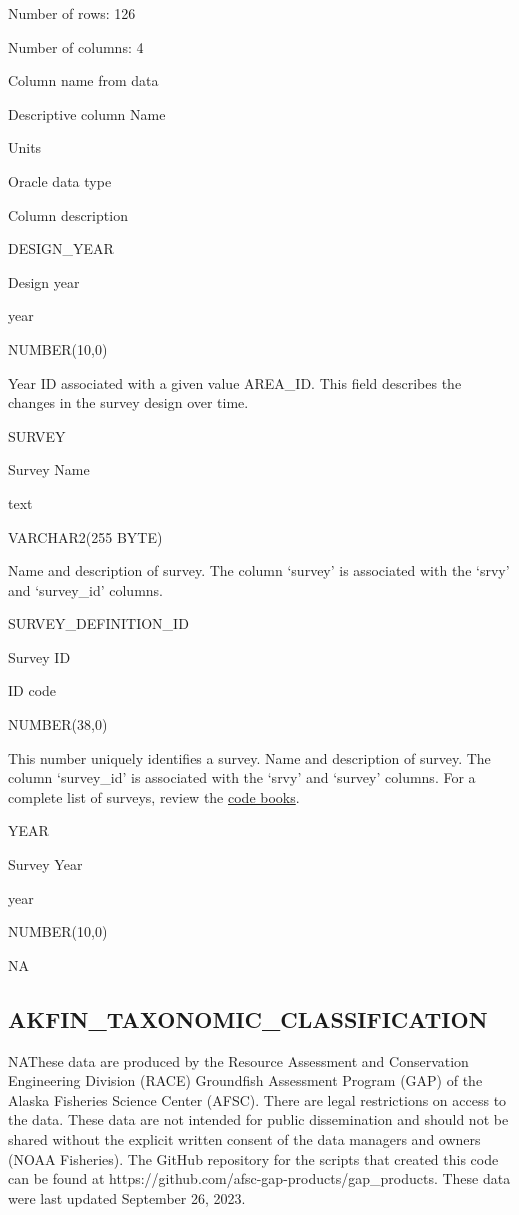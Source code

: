 \documentclass[
  letterpaper,
  oneside,
  open=any]{scrbook}
\begin{document}
Number of rows: 126

Number of columns: 4

Column name from data

Descriptive column Name

Units

Oracle data type

Column description

DESIGN\_YEAR

Design year

year

NUMBER(10,0)

Year ID associated with a given value AREA\_ID. This field describes the
changes in the survey design over time.

SURVEY

Survey Name

text

VARCHAR2(255 BYTE)

Name and description of survey. The column `survey' is associated with
the `srvy' and `survey\_id' columns.

SURVEY\_DEFINITION\_ID

Survey ID

ID code

NUMBER(38,0)

This number uniquely identifies a survey. Name and description of
survey. The column `survey\_id' is associated with the `srvy' and
`survey' columns. For a complete list of surveys, review the
\href{https://www.fisheries.noaa.gov/resource/document/groundfish-survey-species-code-manual-and-data-codes-manual}{code
books}.

YEAR

Survey Year

year

NUMBER(10,0)

NA

\hypertarget{akfin_taxonomic_classification}{%
\subsection{AKFIN\_TAXONOMIC\_CLASSIFICATION}\label{akfin_taxonomic_classification}}

NAThese data are produced by the Resource Assessment and Conservation
Engineering Division (RACE) Groundfish Assessment Program (GAP) of the
Alaska Fisheries Science Center (AFSC). There are legal restrictions on
access to the data. These data are not intended for public dissemination
and should not be shared without the explicit written consent of the
data managers and owners (NOAA Fisheries). The GitHub repository for the
scripts that created this code can be found at
https://github.com/afsc-gap-products/gap\_products. These data were last
updated September 26, 2023.
\end{document}

